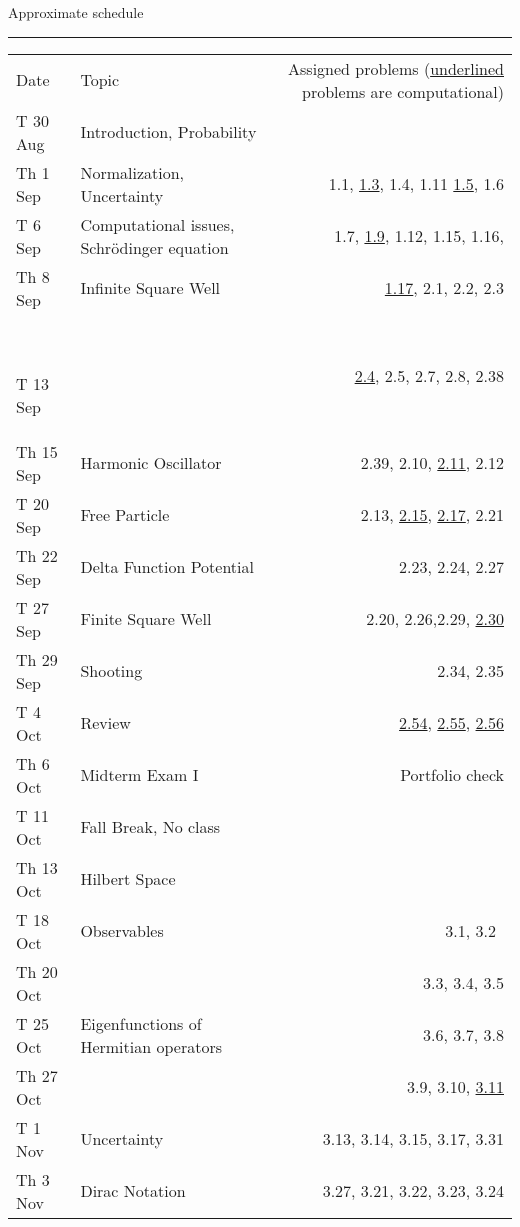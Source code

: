 \documentclass{article}
\begin{document}
\hspace*{-1cm}\begin{minipage}{\textwidth}
\centerline{Approximate schedule}
\vskip0.1cm\hrule\vskip0.5cm
  \begin{tabular}{llr}
    Date & Topic & Assigned problems ({\underline{underlined}} problems are computational)\\[0.5ex]

T 30 Aug & Introduction, Probability& \\
Th 1 Sep & Normalization, Uncertainty & 1.1, {\underline{1.3}}, 1.4, 1.11 {\underline{1.5}}, 1.6\\

T 6 Sep & Computational issues, Schr\"odinger equation & 1.7, {\underline{1.9}}, 1.12, 1.15, 1.16,\\
Th 8 Sep & Infinite Square Well & {\underline{1.17}}, 2.1, 2.2, 2.3\\\

T 13 Sep & &  {\underline{2.4}}, 2.5, 2.7, 2.8, 2.38\\
Th 15 Sep & Harmonic Oscillator & 2.39,  2.10, {\underline{2.11}}, 2.12\\

T 20 Sep & Free Particle &2.13, {\underline{2.15}}, {\underline{2.17}}, 2.21 \\
Th 22 Sep & Delta Function Potential & 2.23, 2.24, 2.27\\

T 27 Sep & Finite Square Well& 2.20, 2.26,2.29, {\underline{2.30}} \\
Th 29 Sep & Shooting & 2.34, 2.35\\

T 4 Oct & Review &  {\underline{2.54}}, {\underline{2.55}}, {\underline{2.56}}\\
Th 6 Oct & Midterm Exam I& Portfolio check\\

T 11 Oct & Fall Break, No class& \\
Th 13 Oct & Hilbert Space & \\

T 18 Oct &Observables &3.1, 3.2\ \\
Th 20 Oct & &  3.3, 3.4, 3.5\\

T 25 Oct & Eigenfunctions of Hermitian operators &3.6, 3.7, 3.8 \\
Th 27 Oct & & 3.9, 3.10, {\underline{3.11}}\\

T 1 Nov & Uncertainty & 3.13, 3.14, 3.15, 3.17, 3.31\\
Th 3 Nov & Dirac Notation &  3.27, 3.21, 3.22, 3.23, 3.24\\


\end{tabular}
\end{minipage}
\end{document}
